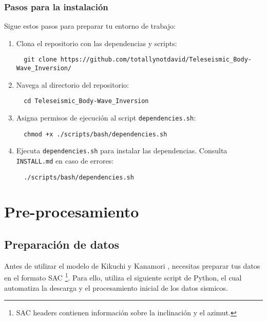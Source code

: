 \documentclass[a4paper,11pt]{refart}
\begin{document}
\subsubsection{Pasos para la instalación}

Sigue estos pasos para preparar tu entorno de trabajo:

\begin{enumerate}
  \item Clona el repositorio con las dependencias y scripts:
  \begin{verbatim}
  git clone https://github.com/totallynotdavid/Teleseismic_Body-Wave_Inversion/
  \end{verbatim}

  \item Navega al directorio del repositorio:
  \begin{verbatim}
  cd Teleseismic_Body-Wave_Inversion
  \end{verbatim}

  \item Asigna permisos de ejecución al script \texttt{dependencies.sh}:
  \begin{verbatim}
  chmod +x ./scripts/bash/dependencies.sh
  \end{verbatim}

  \item Ejecuta \texttt{dependencies.sh} para instalar las dependencias. Consulta \texttt{INSTALL.md} en caso de errores:
  \begin{verbatim}
  ./scripts/bash/dependencies.sh
  \end{verbatim}
\end{enumerate}

\section{Pre-procesamiento}

\subsection{Preparación de datos}

Antes de utilizar el modelo de Kikuchi y Kanamori \cite{Kik2003}, necesitas preparar tus datos en el formato SAC \footnote{SAC headers contienen información sobre la inclinación y el azimut.}. Para ello, utiliza el siguiente script de Python, el cual automatiza la descarga y el procesamiento inicial de los datos sismicos.
\end{document}
